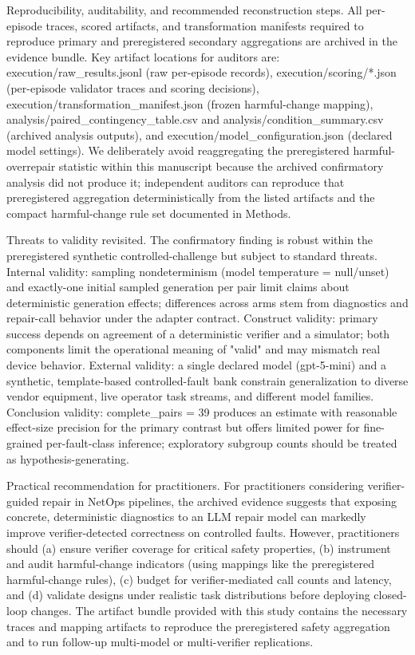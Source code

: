 \documentclass[conference]{IEEEtran}
\begin{document}
Reproducibility, auditability, and recommended reconstruction steps. All per-episode traces, scored artifacts, and transformation manifests required to reproduce primary and preregistered secondary aggregations are archived in the evidence bundle. Key artifact locations for auditors are: execution/raw\_results.jsonl (raw per-episode records), execution/scoring/*.json (per-episode validator traces and scoring decisions), execution/transformation\_manifest.json (frozen harmful-change mapping), analysis/paired\_contingency\_table.csv and analysis/condition\_summary.csv (archived analysis outputs), and execution/model\_configuration.json (declared model settings). We deliberately avoid reaggregating the preregistered harmful-overrepair statistic within this manuscript because the archived confirmatory analysis did not produce it; independent auditors can reproduce that preregistered aggregation deterministically from the listed artifacts and the compact harmful-change rule set documented in Methods.

Threats to validity revisited. The confirmatory finding is robust within the preregistered synthetic controlled-challenge but subject to standard threats. Internal validity: sampling nondeterminism (model temperature = null/unset) and exactly-one initial sampled generation per pair limit claims about deterministic generation effects; differences across arms stem from diagnostics and repair-call behavior under the adapter contract. Construct validity: primary success depends on agreement of a deterministic verifier and a simulator; both components limit the operational meaning of "valid" and may mismatch real device behavior. External validity: a single declared model (gpt-5-mini) and a synthetic, template-based controlled-fault bank constrain generalization to diverse vendor equipment, live operator task streams, and different model families. Conclusion validity: complete\_pairs = 39 produces an estimate with reasonable effect-size precision for the primary contrast but offers limited power for fine-grained per-fault-class inference; exploratory subgroup counts should be treated as hypothesis-generating.

Practical recommendation for practitioners. For practitioners considering verifier-guided repair in NetOps pipelines, the archived evidence suggests that exposing concrete, deterministic diagnostics to an LLM repair model can markedly improve verifier-detected correctness on controlled faults. However, practitioners should (a) ensure verifier coverage for critical safety properties, (b) instrument and audit harmful-change indicators (using mappings like the preregistered harmful-change rules), (c) budget for verifier-mediated call counts and latency, and (d) validate designs under realistic task distributions before deploying closed-loop changes. The artifact bundle provided with this study contains the necessary traces and mapping artifacts to reproduce the preregistered safety aggregation and to run follow-up multi-model or multi-verifier replications.
\end{document}

